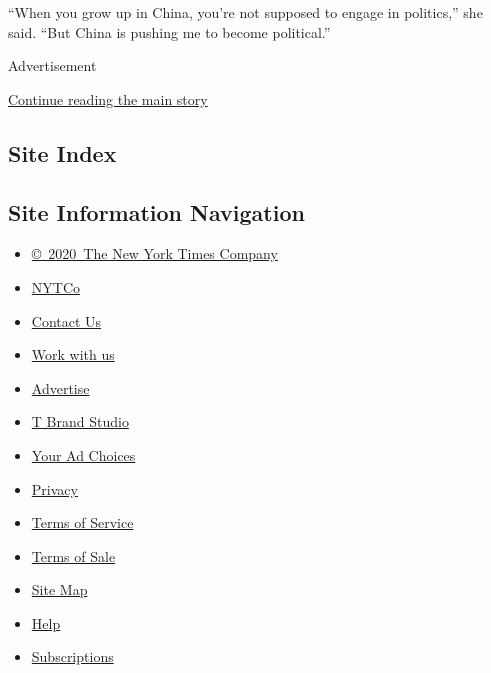 ``When you grow up in China, you're not supposed to engage in
politics,'' she said. ``But China is pushing me to become political.''

Advertisement

\protect\hyperlink{after-bottom}{Continue reading the main story}

\hypertarget{site-index}{%
\subsection{Site Index}\label{site-index}}

\hypertarget{site-information-navigation}{%
\subsection{Site Information
Navigation}\label{site-information-navigation}}

\begin{itemize}
\tightlist
\item
  \href{https://help.nytimes.com/hc/en-us/articles/115014792127-Copyright-notice}{©~2020~The
  New York Times Company}
\end{itemize}

\begin{itemize}
\tightlist
\item
  \href{https://www.nytco.com/}{NYTCo}
\item
  \href{https://help.nytimes.com/hc/en-us/articles/115015385887-Contact-Us}{Contact
  Us}
\item
  \href{https://www.nytco.com/careers/}{Work with us}
\item
  \href{https://nytmediakit.com/}{Advertise}
\item
  \href{http://www.tbrandstudio.com/}{T Brand Studio}
\item
  \href{https://www.nytimes.com/privacy/cookie-policy\#how-do-i-manage-trackers}{Your
  Ad Choices}
\item
  \href{https://www.nytimes.com/privacy}{Privacy}
\item
  \href{https://help.nytimes.com/hc/en-us/articles/115014893428-Terms-of-service}{Terms
  of Service}
\item
  \href{https://help.nytimes.com/hc/en-us/articles/115014893968-Terms-of-sale}{Terms
  of Sale}
\item
  \href{https://spiderbites.nytimes.com}{Site Map}
\item
  \href{https://help.nytimes.com/hc/en-us}{Help}
\item
  \href{https://www.nytimes.com/subscription?campaignId=37WXW}{Subscriptions}
\end{itemize}
